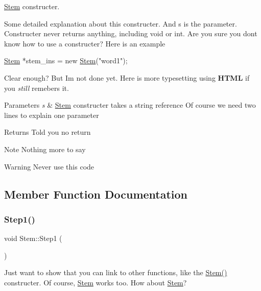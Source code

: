 \hyperlink{class_stem}{Stem} constructer. 

Some detailed explanation about this constructer. And {\ttfamily s} is the parameter. Constructer never returns anything, including {\ttfamily void} or {\ttfamily int}. Are you sure you don\textquotesingle{}t know how to use a constructer? Here is an example 
\begin{DoxyCode}
\hyperlink{class_stem}{Stem} *stem\_ins = \textcolor{keyword}{new} \hyperlink{class_stem_a2b8b95a758defb2542da3aee21bd3463}{Stem}(\textcolor{stringliteral}{"word1"});
\end{DoxyCode}
 Clear enough? But I\textquotesingle{}m not done yet. Here is more typesetting using {\bfseries H\+T\+ML} if you {\itshape still} remebers it.


\begin{DoxyParams}{Parameters}
{\em s} & \hyperlink{class_stem}{Stem} constructer takes a string reference Of course we need two lines to explain one parameter \\
\hline
\end{DoxyParams}
\begin{DoxyReturn}{Returns}
Told you no return 
\end{DoxyReturn}
\begin{DoxyNote}{Note}
Nothing more to say 
\end{DoxyNote}
\begin{DoxyWarning}{Warning}
Never use this code 
\end{DoxyWarning}


\subsection{Member Function Documentation}
\mbox{\label{class_stem_a0664001fe76935498f49932b446d43c3}} 
\subsubsection{\texorpdfstring{Step1()}{Step1()}}
{\footnotesize\ttfamily void Stem\+::\+Step1 (\begin{DoxyParamCaption}{ }\end{DoxyParamCaption})\hspace{0.3cm}{\ttfamily [inline]}}

Just want to show that you can link to other functions, like the \hyperlink{class_stem_a2b8b95a758defb2542da3aee21bd3463}{Stem()} constructer. Of course, \hyperlink{class_stem}{Stem} works too. How about \hyperlink{class_stem}{Stem}? \mbox{\label{class_stem_a95139a3503d1ce3307635cc714af22b8}} 
